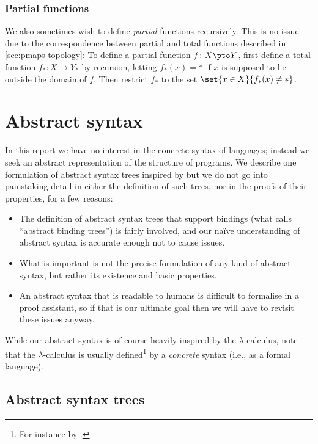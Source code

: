 \subsubsection{Partial functions}

We also sometimes wish to define \emph{partial} functions recursively. This is no issue due to the correspondence between partial and total functions described in \cref{sec:pmaps-topology}: To define a partial function $f \colon X \pto Y$, first define a total function $f_* \colon X \to Y_*$ by recursion, letting $f_*(x) = *$ if $x$ is supposed to lie outside the domain of $f$. Then restrict $f_*$ to the set $\set{x \in X}{f_*(x) \neq *}$.

\section{Abstract syntax}

In this report we have no interest in the concrete syntax of languages; instead we seek an abstract representation of the structure of programs. We describe one formulation of abstract syntax trees \textdash inspired by \textcite{harper-pl} \textdash but we do not go into painstaking detail in either the definition of such trees, nor in the proofs of their properties, for a few reasons:
%
\begin{itemize}
    \item The definition of abstract syntax trees that support bindings (what \citeauthor{harper-pl} calls \enquote{abstract binding trees}) is fairly involved, and our naïve understanding of abstract syntax is accurate enough not to cause issues.

    \item What is important is not the precise formulation of any kind of abstract syntax, but rather its existence and basic properties.
    
    \item An abstract syntax that is readable to humans is difficult to formalise in a proof assistant, so if that is our ultimate goal then we will have to revisit these issues anyway.
\end{itemize}
%
While our abstract syntax is of course heavily inspired by the $\lambda$-calculus, note that the $\lambda$-calculus is usually defined\footnote{For instance by \textcite{barendregt-lambda}.} by a \emph{concrete} syntax (i.e., as a formal language).


\subsection{Abstract syntax trees}

